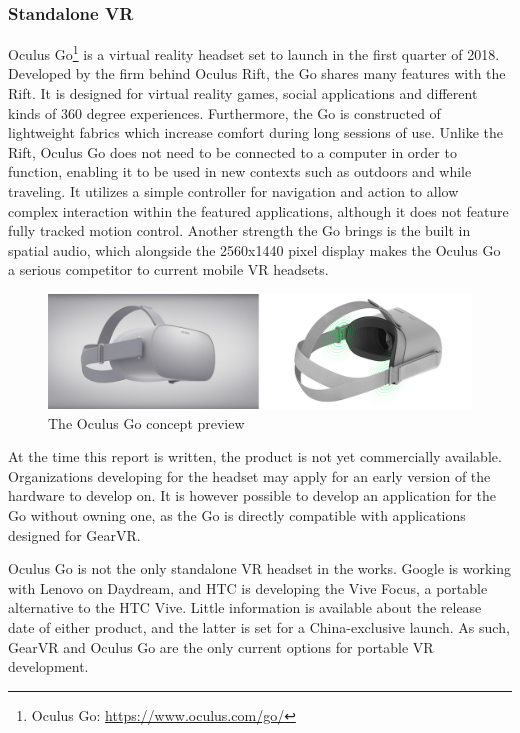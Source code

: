 \subsubsection{Standalone VR}
Oculus Go\footnote{Oculus Go: \url{https://www.oculus.com/go/}} is a virtual reality headset set to launch in the first quarter of 2018. Developed by the firm behind Oculus Rift, the Go shares many features with the Rift. It is designed for virtual reality games, social applications and different kinds of 360 degree experiences. Furthermore, the Go is constructed of lightweight fabrics which increase comfort during long sessions of use. Unlike the Rift, Oculus Go does not need to be connected to a computer in order to function, enabling it to be used in new contexts such as outdoors and while traveling. It utilizes a simple controller for navigation and action to allow complex interaction within the featured applications, although it does not feature fully tracked motion control. Another strength the Go brings is the built in spatial audio, which alongside the 2560x1440 pixel display makes the Oculus Go a serious competitor to current mobile VR headsets.  \\
\begin{figure}[H]
	\centering
	\includegraphics[width=1.0\linewidth]{figure/Analysis/oculusgo}
	\caption{The Oculus Go concept preview}
	\label{fig:Oculus}
\end{figure}

At the time this report is written, the product is not yet commercially available. Organizations developing for the headset may apply for an early version of the hardware to develop on. It is however possible to develop an application for the Go without owning one, as the Go is directly compatible with applications designed for GearVR. 

Oculus Go is not the only standalone VR headset in the works. Google is working with Lenovo on Daydream, and HTC is developing the Vive Focus, a portable alternative to the HTC Vive. Little information is available about the release date of either product, and the latter is set for a China-exclusive launch. As such, GearVR and Oculus Go are the only current options for portable VR development. 


